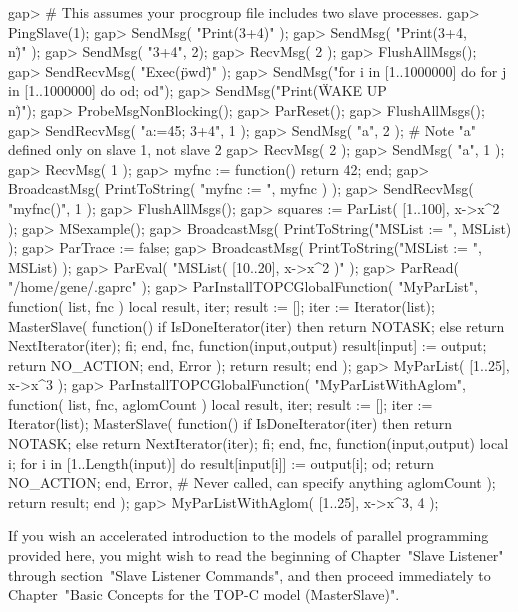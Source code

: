 gap>  # This assumes your procgroup file includes two slave processes.
gap>  PingSlave(1);
gap>  SendMsg( "Print(3+4)" );
gap>  SendMsg( "Print(3+4,\"\\n\")" );
gap>  SendMsg( "3+4", 2);
gap>  RecvMsg( 2 );
gap>  FlushAllMsgs();
gap>  SendRecvMsg( "Exec(\"pwd\")" );
gap>  SendMsg("for i in [1..1000000] do for j in [1..1000000] do od; od");
gap>  SendMsg("Print(\"WAKE UP\\n\")");
gap>  ProbeMsgNonBlocking();
gap>  ParReset();
gap>  FlushAllMsgs();
gap>  SendRecvMsg( "a:=45; 3+4", 1 );
gap>  SendMsg( "a", 2 );   # Note "a" defined only on slave 1, not slave 2
gap>  RecvMsg( 2 );
gap>  SendMsg( "a", 1 );
gap>  RecvMsg( 1 );
gap>  myfnc := function() return 42; end;
gap>  BroadcastMsg( PrintToString( "myfnc := ", myfnc ) );
gap>  SendRecvMsg( "myfnc()", 1 );
gap>  FlushAllMsgs();
gap>  squares := ParList( [1..100], x->x^2 );
gap>  MSexample();
gap>  BroadcastMsg( PrintToString("MSList := ", MSList) );
gap>  ParTrace := false;
gap>  BroadcastMsg( PrintToString("MSList := ", MSList) );
gap>  ParEval( "MSList( [10..20], x->x^2 )" );
gap>  ParRead( "/home/gene/.gaprc" );
gap>  ParInstallTOPCGlobalFunction( "MyParList",
function( list, fnc )
  local result, iter;
  result := [];
  iter := Iterator(list);
  MasterSlave( function() if IsDoneIterator(iter) then return NOTASK;
                          else return NextIterator(iter); fi; end,
               fnc,
               function(input,output) result[input] := output; 
                                      return NO_ACTION; end,
               Error
             );
  return result;
end );
gap> MyParList( [1..25], x->x^3 );
gap> ParInstallTOPCGlobalFunction( "MyParListWithAglom",
function( list, fnc, aglomCount )
  local result, iter;
  result := [];
  iter := Iterator(list);
  MasterSlave( function() if IsDoneIterator(iter) then return NOTASK;
                          else return NextIterator(iter); fi; end,
               fnc,
               function(input,output)
                 local i;
                 for i in [1..Length(input)] do
                   result[input[i]] := output[i];
                 od;
                 return NO_ACTION;
               end,
               Error,  # Never called, can specify anything
               aglomCount
             );
  return result;
end );
gap> MyParListWithAglom( [1..25], x->x^3, 4 );

\endexample

If you wish an accelerated introduction to the models of parallel
programming provided here, you might wish to read the beginning of
Chapter~"Slave Listener" through section~"Slave Listener Commands", and
then proceed immediately to Chapter~"Basic Concepts for the TOP-C model
(MasterSlave)".

